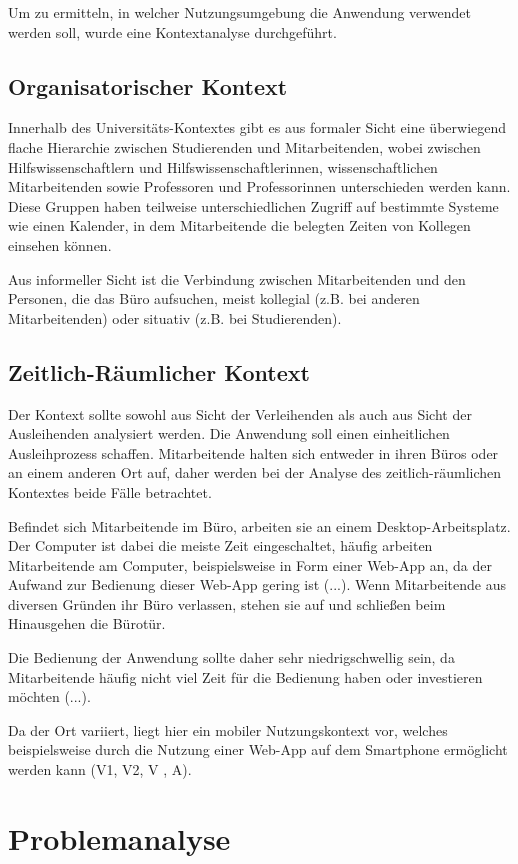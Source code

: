 Um zu ermitteln, in welcher Nutzungsumgebung die Anwendung verwendet werden
soll, wurde eine Kontextanalyse durchgeführt.

\subsection*{Organisatorischer Kontext}
Innerhalb des Universitäts-Kontextes gibt es aus formaler Sicht eine überwiegend
flache Hierarchie zwischen Studierenden und Mitarbeitenden, wobei zwischen
Hilfswissenschaftlern und Hilfswissenschaftlerinnen, wissenschaftlichen
Mitarbeitenden sowie Professoren und Professorinnen unterschieden werden kann.
Diese Gruppen haben teilweise unterschiedlichen Zugriff auf bestimmte Systeme
wie einen Kalender, in dem Mitarbeitende die belegten Zeiten von Kollegen
einsehen können.

Aus informeller Sicht ist die Verbindung zwischen Mitarbeitenden und den
Personen, die das Büro aufsuchen, meist kollegial (z.B. bei anderen
Mitarbeitenden) oder situativ (z.B. bei Studierenden).

\subsection*{Zeitlich-Räumlicher Kontext}
\label{section:zeit}
Der Kontext sollte sowohl aus Sicht der Verleihenden als auch aus Sicht der
Ausleihenden analysiert werden. Die Anwendung soll einen einheitlichen
Ausleihprozess schaffen. Mitarbeitende halten sich entweder in ihren Büros oder
an einem anderen Ort auf, daher werden bei der Analyse des zeitlich-räumlichen
Kontextes beide Fälle betrachtet.

Befindet sich Mitarbeitende im Büro, arbeiten sie an einem Desktop-Arbeitsplatz.
Der Computer ist dabei die meiste Zeit eingeschaltet, häufig arbeiten
Mitarbeitende am Computer, beispielsweise in Form einer Web-App an, da der
Aufwand zur Bedienung dieser Web-App gering ist (...). Wenn Mitarbeitende aus
diversen Gründen ihr Büro verlassen, stehen sie auf und schließen beim
Hinausgehen die Bürotür.

Die Bedienung der Anwendung sollte daher sehr niedrigschwellig sein, da
Mitarbeitende häufig nicht viel Zeit für die Bedienung haben oder investieren
möchten (...).

Da der Ort variiert, liegt hier ein mobiler Nutzungskontext vor, welches
beispielsweise durch die Nutzung einer Web-App auf dem Smartphone ermöglicht
werden kann (V1, V2, V , A).


\section{Problemanalyse}
\label{section:iststand}

